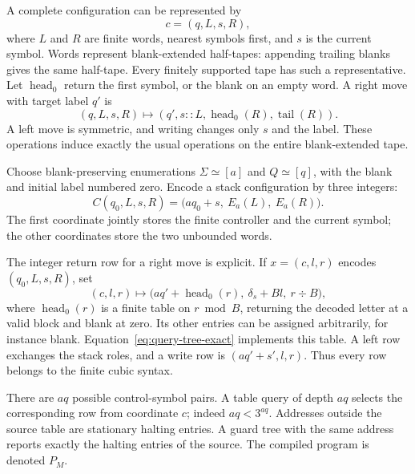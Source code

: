 \documentclass[11pt]{article}
\numberwithin{equation}{section}
\theoremstyle{definition}
\theoremstyle{remark}
\begin{document}
A complete configuration can be represented by
\[
 c=(q,L,s,R),
\]
where $L$ and $R$ are finite words, nearest symbols first, and $s$ is
the current symbol. Words represent blank-extended half-tapes:
appending trailing blanks gives the same half-tape. Every finitely
supported tape has such a representative. Let $\operatorname{head}_0$
return the first symbol, or the blank on an empty word. A right move
with target label $q'$ is
\begin{equation}\label{eq:stack-move}
 (q,L,s,R)\longmapsto
 (q',s::L,\operatorname{head}_0(R),\operatorname{tail}(R)).
\end{equation}
A left move is symmetric, and writing changes only $s$ and the label.
These operations induce exactly the usual operations on the entire
blank-extended tape.

Choose blank-preserving enumerations $\Sigma\simeq[a]$ and $Q\simeq[q]$,
with the blank and initial label numbered zero. Encode a stack
configuration by three integers:
\begin{equation}\label{eq:configuration-code}
 C(q_0,L,s,R)=\bigl(aq_0+s,\ E_a(L),\ E_a(R)\bigr).
\end{equation}
The first coordinate jointly stores the finite controller and the
current symbol; the other coordinates store the two unbounded words.

The integer return row for a right move is explicit. If
$x=(c,l,r)$ encodes $(q_0,L,s,R)$, set
\begin{equation}\label{eq:right-row}
 (c,l,r)\longmapsto
 \bigl(aq'+\operatorname{head}_0(r),\ \delta_s+Bl,\ r\div B\bigr),
\end{equation}
where $\operatorname{head}_0(r)$ is a finite table on $r\bmod B$,
returning the decoded letter at a valid block and blank at zero.
Its other entries can be assigned arbitrarily, for instance blank.
Equation~\eqref{eq:query-tree-exact} implements this table. A left
row exchanges the stack roles, and a write row is
$(aq'+s',l,r)$. Thus every row belongs to the finite cubic syntax.

There are $aq$ possible control-symbol pairs. A table query of depth
$aq$ selects the corresponding row from coordinate $c$; indeed
$aq<3^{aq}$. Addresses outside the source table are stationary halting
entries. A guard tree with the same address reports exactly the halting
entries of the source. The compiled program is denoted $P_M$.
\end{document}
